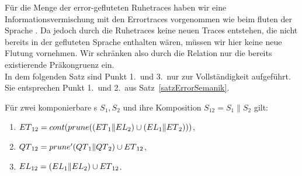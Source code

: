 Für die Menge der error-gefluteten Ruhetraces \QT{} haben wir eine Informationsvermischung
mit den Errortraces vorgenommen wie beim fluten der Sprache \EL{}. Da jedoch
durch die Ruhetraces keine neuen Traces entstehen, die nicht bereits in der
gefluteten Sprache \EL{} enthalten wären, müssen wir hier keine neue Flutung
vornehmen. Wir schränken also durch die Relation \QRel{} nur die
bereits existierende Präkongruenz \ERel{} ein.\\
In dem folgenden Satz sind Punkt 1.\ und 3.\ nur zur Vollständigkeit aufgeführt.
Sie entsprechen Punkt 1.\ und 2.\ aus Satz~\ref{satzErrorSemanik}.

\begin{satz}
  \label{satzQuiSemantik}
  Für zwei komponierbare \EIO{}s $S_1, S_2$ und ihre Komposition $S_{12} =
  S_1\|S_2$ gilt:
  \begin{enumerate}
    \item $ET{}_{12} = cont{}(prune{}((ET{}_1\|EL{}_2)\cup (EL{}_1\|ET{}_2)))$,
    \item $QT{}_{12} = prune'(QT{}_1\|QT{}_2)\cup ET{}_{12}$,
    \item $EL{}_{12} = (EL{}_1\|EL{}_2)\cup ET{}_{12}$.
  \end{enumerate}
\end{satz}

